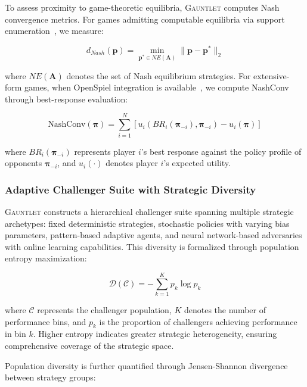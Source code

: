 \documentclass[sigconf,anonymous]{aamas}
\begin{document}
To assess proximity to game-theoretic equilibria, \textsc{Gauntlet} computes Nash convergence metrics. For games admitting computable equilibria via support enumeration~\cite{Lanctot2019OpenSpielOS}, we measure:

\begin{equation}
d_{Nash}(\mathbf{p}) = \min_{\mathbf{p}^* \in NE(\mathbf{A})} \|\mathbf{p} - \mathbf{p}^*\|_2
\label{eq:nash_distance}
\end{equation}

where $NE(\mathbf{A})$ denotes the set of Nash equilibrium strategies. For extensive-form games, when OpenSpiel integration is available~\cite{Lanctot2019OpenSpielOS}, we compute NashConv through best-response evaluation:

\begin{equation}
\text{NashConv}(\boldsymbol{\pi}) = \sum_{i=1}^{N} \left[u_i(BR_i(\boldsymbol{\pi}_{-i}), \boldsymbol{\pi}_{-i}) - u_i(\boldsymbol{\pi})\right]
\label{eq:nashconv}
\end{equation}

where $BR_i(\boldsymbol{\pi}_{-i})$ represents player $i$'s best response against the policy profile of opponents $\boldsymbol{\pi}_{-i}$, and $u_i(\cdot)$ denotes player $i$'s expected utility.

\subsubsection{Adaptive Challenger Suite with Strategic Diversity}

\textsc{Gauntlet} constructs a hierarchical challenger suite spanning multiple strategic archetypes: fixed deterministic strategies, stochastic policies with varying bias parameters, pattern-based adaptive agents, and neural network-based adversaries with online learning capabilities. This diversity is formalized through population entropy maximization:

\begin{equation}
\mathcal{D}(\mathcal{C}) = -\sum_{k=1}^{K} p_k \log p_k
\label{eq:diversity}
\end{equation}

where $\mathcal{C}$ represents the challenger population, $K$ denotes the number of performance bins, and $p_k$ is the proportion of challengers achieving performance in bin $k$. Higher entropy indicates greater strategic heterogeneity, ensuring comprehensive coverage of the strategic space.

Population diversity is further quantified through Jensen-Shannon divergence between strategy groups:
\end{document}
